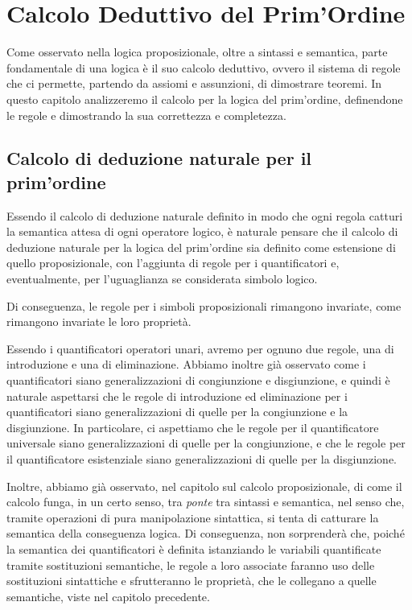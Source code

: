 \chapter{Calcolo Deduttivo del Prim'Ordine}

Come osservato nella logica proposizionale, oltre a sintassi e semantica, parte fondamentale di una logica è il suo calcolo deduttivo, ovvero il sistema di regole che ci permette, partendo da assiomi e assunzioni, di dimostrare teoremi. In questo capitolo analizzeremo il calcolo per la logica del prim'ordine, definendone le regole e dimostrando la sua correttezza e completezza.

\section{Calcolo di deduzione naturale per il prim'ordine}

Essendo il calcolo di deduzione naturale definito in modo che ogni regola catturi la semantica attesa di ogni operatore logico, è naturale pensare che il calcolo di deduzione naturale per la logica del prim'ordine sia definito come estensione di quello proposizionale, con l'aggiunta di regole per i quantificatori e, eventualmente, per l'uguaglianza se considerata simbolo logico.

Di conseguenza, le regole per i simboli proposizionali rimangono invariate, come rimangono invariate le loro proprietà.

Essendo i quantificatori operatori unari, avremo per ognuno due regole, una di introduzione e una di eliminazione. Abbiamo inoltre già osservato come i quantificatori siano generalizzazioni di congiunzione e disgiunzione, e quindi è naturale aspettarsi che le regole di introduzione ed eliminazione per i quantificatori siano generalizzazioni di quelle per la congiunzione e la disgiunzione. In particolare, ci aspettiamo che le regole per il quantificatore universale siano generalizzazioni di quelle per la congiunzione, e che le regole per il quantificatore esistenziale siano generalizzazioni di quelle per la disgiunzione.

Inoltre, abbiamo già osservato, nel capitolo sul calcolo proposizionale, di come il calcolo funga, in un certo senso, tra \textit{ponte} tra sintassi e semantica, nel senso che, tramite operazioni di pura manipolazione sintattica, si tenta di catturare la semantica della conseguenza logica. Di conseguenza, non sorprenderà che, poiché la semantica dei quantificatori è definita istanziando le variabili quantificate tramite sostituzioni semantiche, le regole a loro associate faranno uso delle sostituzioni sintattiche e sfrutteranno le proprietà, che le collegano a quelle semantiche, viste nel capitolo precedente. 

